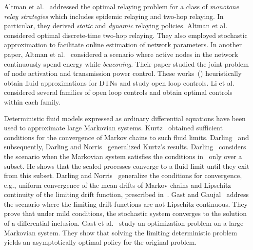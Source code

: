 \documentclass[10pt,journal,letterpaper]{IEEEtran}
\begin{document}
Altman et al.~\cite{stochctrl-dtn.altmanetal10monotone-forwarding-policies} addressed
the optimal relaying problem for a class of {\it monotone relay strategies} which
includes epidemic relaying and two-hop relaying. In particular,
they derived {\it static} and {\it dynamic} relaying policies.
Altman et al.~\cite{ctrltheory-dtn.altman-etal09decentralized-stochastic-control}
considered optimal discrete-time two-hop relaying. They also employed stochastic
approximation to facilitate online estimation of network parameters.
In another paper, Altman et al.~\cite{ctrltheory-dtn.altman-etal10optimal-activation-transmission-control} considered
a scenario where active nodes in the network continuously spend energy
while {\it beaconing}. Their paper studied the joint problem of node activation
and transmission power control. These works~(\cite{stochctrl-dtn.altmanetal10monotone-forwarding-policies,ctrltheory-dtn.altman-etal09decentralized-stochastic-control,ctrltheory-dtn.altman-etal10optimal-activation-transmission-control})
heuristically obtain fluid approximations for DTNs and study open
loop controls. Li et al.~\cite{stochctrl-dtn.lietal10optimal-opportunistic-forwarding}
considered several families
of open loop controls and obtain optimal controls within each family.


Deterministic fluid models expressed as ordinary differential equations have been used to approximate
large Markovian systems. Kurtz~\cite{stochproc.kurtz70limits-markov-processes} obtained sufficient
conditions for the convergence of Markov chains to such fluid limits. Darling~\cite{stochproc.darling02fluid-limits} and subsequently, Darling and Norris~\cite{stochproc.darling-norris08differential-equation-approximations} generalized Kurtz's results. Darling~\cite{stochproc.darling02fluid-limits} considers the scenario when the  Markovian system satisfies the conditions in~\cite{stochproc.kurtz70limits-markov-processes} only over a subset. He shows that the scaled processes converge to a fluid limit until they exit from this subset. Darling and Norris~\cite{stochproc.darling-norris08differential-equation-approximations} generalize the conditions for convergence, e.g., uniform convergence of the mean drifts of Markov chains and Lipschitz continuity of the limiting drift function, prescribed in~\cite{stochproc.kurtz70limits-markov-processes}.  Gast and Gaujal~\cite{stochctrl.gast-gaujal10mean-field-nonsmooth} address the scenario where the limiting drift functions are not Lipschitz continuous. They prove that under mild conditions, the stochastic system converges to the solution of a differential inclusion. Gast et al.~\cite{stochctrl.gast-etal10mean-field-MDPs} study an optimization problem on a large Markovian system. They show that solving the limiting deterministic problem yields an asymptotically optimal policy for the original problem.
\end{document}

